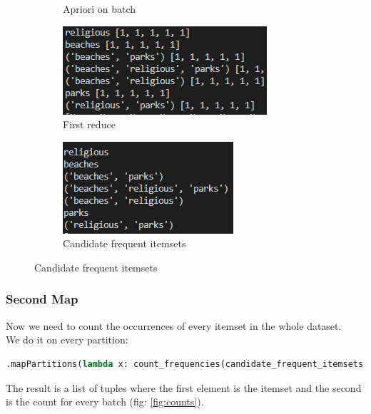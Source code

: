 \documentclass[a4paper]{article}
\begin{document}
\begin{figure}[h]
\begin{subfigure}[b]{0.24\textwidth}
         	\caption{Apriori on batch}
         	\label{fig:apriori}
		\end{subfigure}
		\hfill
		\begin{subfigure}[b]{0.24\textwidth}
			\centering
			\includegraphics[width=\textwidth]{grouped.PNG}
         	\caption{First reduce}
         	\label{fig:grouped}
		\end{subfigure}
		\hfill
		\begin{subfigure}[b]{0.24\textwidth}
			\centering
			\includegraphics[width=\textwidth]{candidates.PNG}
         	\caption{Candidate frequent itemsets}
         	\label{fig:candidate_fi}
		\end{subfigure}
	
	\end{figure}
	
	\subsubsection{Second Map}
	Now we need to count the occurrences of every itemset in the whole dataset.\\
	We do it on every partition:
	\begin{lstlisting}[language=Python]
.mapPartitions(lambda x: count_frequencies(candidate_frequent_itemsets.value, list(x)))
	\end{lstlisting}
	The result is a list of tuples where the first element is the itemset and the second is the count for every batch (fig: \ref{fig:counts}).
	
\end{document}
